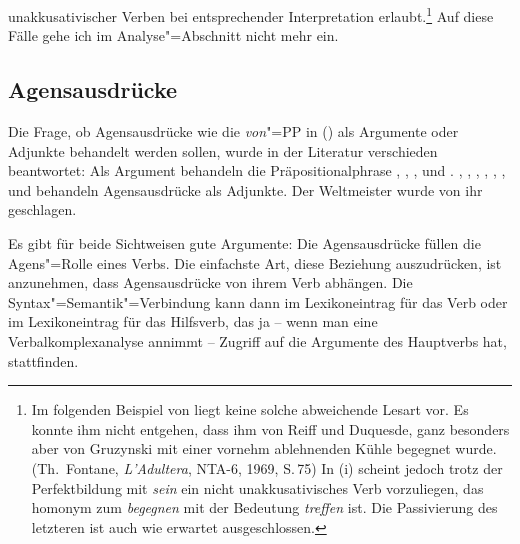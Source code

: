 unakkusativischer Verben bei entsprechender Interpretation erlaubt.\footnote{
        Im folgenden Beispiel von \citet[]{Faucher87}
        liegt keine solche abweichende Lesart vor.
        \ea
        Es konnte ihm nicht entgehen, dass ihm von Reiff und Duquesde,
        ganz besonders aber von Gruzynski mit einer vornehm
        ablehnenden Kühle begegnet wurde. (Th.\ Fontane, \emph{L'Adultera},
        NTA-6, 1969, S.\,75)
        \z
        In (i) scheint jedoch trotz der Perfektbildung mit \emph{sein}
        ein nicht unakkusativisches Verb vorzuliegen, das homonym zum \emph{begegnen}
        mit der Bedeutung \emph{treffen} ist. Die Passivierung des letzteren
        ist auch wie erwartet ausgeschlossen.
        \eal
        \zllast
}
Auf diese Fälle gehe ich im Analyse"=Abschnitt nicht mehr ein. 
\largerpage[2]

\subsection{Agensausdrücke}

Die Frage, ob Agensausdrücke wie die \emph{von}"=PP in () als Argumente
oder Adjunkte behandelt werden sollen, wurde in der Literatur verschieden beantwortet: Als Argument behandeln 
die Präpositionalphrase \zb \citet[]{Heringer73a}, 
\citet{Bresnan82a}, \citet[215]{ps}, \citet{MS98a} und \citet[Abschnitt~15.3]{Mueller99a}.
%
\citet[]{Hoehle78a}, \citet{Sadzinski87a}, \citet[]{Stechow90a}, 
\citet[]{Zifonun92a}, 
\citet[]{Lieb92a},
\citet[]{Wunderlich93a}, 
\citet[Abschnitt~5]{Mueller2003e} und 
\citet[]{Gunkel2003b} 
behandeln Agensausdrücke als Adjunkte.
\ea
Der Weltmeister wurde von ihr geschlagen.
\z

\noindent
Es gibt für beide Sichtweisen gute Argumente: Die Agensausdrücke füllen die Agens"=Rolle
eines Verbs. Die einfachste Art, diese Beziehung auszudrücken, ist anzunehmen, dass Agensausdrücke
von ihrem Verb abhängen. Die Syntax"=Semantik"=Verbindung kann dann im Lexikoneintrag für das
Verb oder im Lexikoneintrag für das Hilfsverb, das ja -- wenn man eine Verbalkomplexanalyse annimmt --
Zugriff auf die Argumente des Hauptverbs hat, stattfinden.

